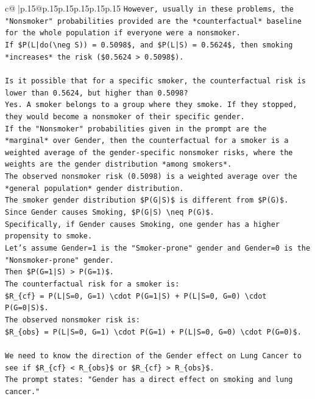 \documentclass{article}
\begin{document}
{\begin{supertabular}{c@{$\;$}|p{.15\linewidth}@{}p{.15\linewidth}p{.15\linewidth}p{.15\linewidth}p{.15\linewidth}p{.15\linewidth}}
{{{\texttt{However, usually in these problems, the "Nonsmoker" probabilities provided are the *counterfactual* baseline for the whole population if everyone were a nonsmoker.} \\
\texttt{If \$P(L|do(\textbackslash{}neg S)) = 0.5098\$, and \$P(L|S) = 0.5624\$, then smoking *increases* the risk (\$0.5624 > 0.5098\$).} \\
\\ 
\texttt{Is it possible that for a specific smoker, the counterfactual risk is lower than 0.5624, but higher than 0.5098?} \\
\texttt{Yes. A smoker belongs to a group where they smoke. If they stopped, they would become a nonsmoker of their specific gender.} \\
\texttt{If the "Nonsmoker" probabilities given in the prompt are the *marginal* over Gender, then the counterfactual for a smoker is a weighted average of the gender{-}specific nonsmoker risks, where the weights are the gender distribution *among smokers*.} \\
\texttt{The observed nonsmoker risk (0.5098) is a weighted average over the *general population* gender distribution.} \\
\texttt{The smoker gender distribution \$P(G|S)\$ is different from \$P(G)\$.} \\
\texttt{Since Gender causes Smoking, \$P(G|S) \textbackslash{}neq P(G)\$.} \\
\texttt{Specifically, if Gender causes Smoking, one gender has a higher propensity to smoke.} \\
\texttt{Let's assume Gender=1 is the "Smoker{-}prone" gender and Gender=0 is the "Nonsmoker{-}prone" gender.} \\
\texttt{Then \$P(G=1|S) > P(G=1)\$.} \\
\texttt{The counterfactual risk for a smoker is:} \\
\texttt{\$R\_\{cf\} = P(L|S=0, G=1) \textbackslash{}cdot P(G=1|S) + P(L|S=0, G=0) \textbackslash{}cdot P(G=0|S)\$.} \\
\texttt{The observed nonsmoker risk is:} \\
\texttt{\$R\_\{obs\} = P(L|S=0, G=1) \textbackslash{}cdot P(G=1) + P(L|S=0, G=0) \textbackslash{}cdot P(G=0)\$.} \\
\\ 
\texttt{We need to know the direction of the Gender effect on Lung Cancer to see if \$R\_\{cf\} < R\_\{obs\}\$ or \$R\_\{cf\} > R\_\{obs\}\$.} \\
\texttt{The prompt states: "Gender has a direct effect on smoking and lung cancer."} \\
}}}
\end{supertabular}}
\end{document}
